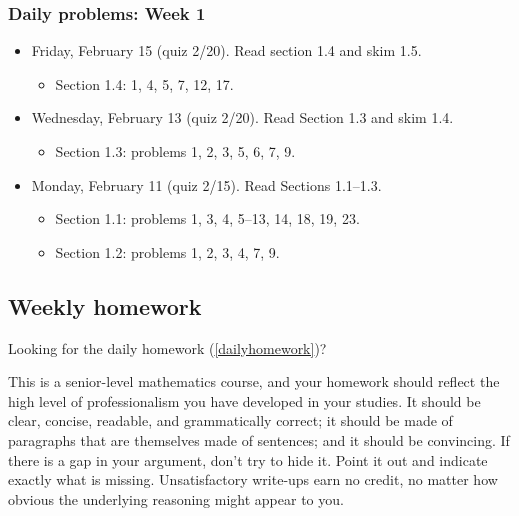 \subsubsection{Daily problems: Week 1}
\label{dailyproblems:week1}

\begin{itemize}
\item Friday, February 15 (quiz 2\slash 20). Read section 1.4 and skim 1.5.

\begin{itemize}
\item Section 1.4: 1, 4, 5, 7, 12, 17.

\end{itemize}

\item Wednesday, February 13 (quiz 2\slash 20). Read Section 1.3 and skim 1.4.

\begin{itemize}
\item Section 1.3: problems 1, 2, 3, 5, 6, 7, 9.

\end{itemize}

\item Monday, February 11 (quiz 2\slash 15). Read Sections 1.1--1.3.

\begin{itemize}
\item Section 1.1: problems 1, 3, 4, 5--13, 14, 18, 19, 23.

\item Section 1.2: problems 1, 2, 3, 4, 7, 9.

\end{itemize}

\end{itemize}

\subsection{Weekly homework}
\label{weeklyhomework}

Looking for the daily homework (\autoref{dailyhomework})?

This is a senior-level mathematics course, and your homework should reflect the high level of professionalism you have developed in your studies. It should be clear, concise, readable, and grammatically correct; it should be made of paragraphs that are themselves made of sentences; and it should be convincing. If there is a gap in your argument, don't try to hide it. Point it out and indicate exactly what is missing. Unsatisfactory write-ups earn no credit, no matter how obvious the underlying reasoning might appear to you.


